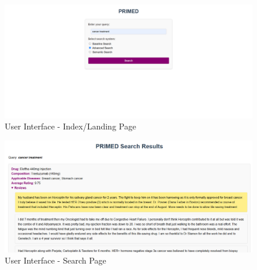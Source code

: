 \documentclass[sigconf]{acmart}
\begin{document}
\begin{figure}[H]
  \centering
  \includegraphics[width=0.8\linewidth]{indexUI.png}
  \caption{User Interface - Index/Landing Page}
  \label{fig:indexUI}
\end{figure}

\begin{figure}[H]
  \centering
  \includegraphics[width=0.8\linewidth]{searchUI.png}
  \caption{User Interface - Search Page}
  \label{fig:searchUI}
\end{figure}

\end{document}
